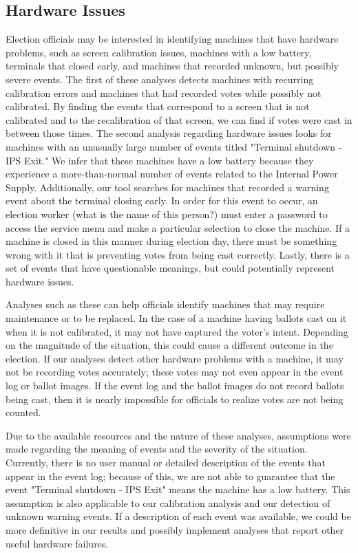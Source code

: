 \subsection{Hardware Issues}
Election officials may be interested in identifying machines that have hardware problems, such as screen calibration issues, machines with a low battery, terminals that closed early, and machines that recorded unknown, but possibly severe events.  The first of these analyses detects machines with recurring calibration errors and machines that had recorded votes while possibly not calibrated.  By finding the events that correspond to a screen that is not calibrated and to the recalibration of that screen, we can find if votes were cast in between those times.  The second analysis regarding hardware issues looks for machines with an unusually large number of events titled "Terminal shutdown - IPS Exit."  We infer that these machines have a low battery because they experience a more-than-normal number of events related to the Internal Power Supply.  Additionally, our tool searches for machines that recorded a warning event about the terminal closing early.  In order for this event to occur, an election worker (what is the name of this person?) must enter a password to access the service menu and make a particular selection to close the machine.  If a machine is closed in this manner during election day, there must be something wrong with it that is preventing votes from being cast correctly.  Lastly, there is a set of events that have questionable meanings, but could potentially represent hardware issues.   

Analyses such as these can help officials identify machines that may require maintenance or to be replaced.  In the case of a machine having ballots cast on it when it is not calibrated, it may not have captured the voter's intent.  Depending on the magnitude of the situation, this could cause a different outcome in the election.  If our analyses detect other hardware problems with a machine, it may not be recording votes accurately; these votes may not even appear in the event log or ballot images.  If the event log and the ballot images do not record ballots being cast, then it is nearly impossible for officials to realize votes are not being counted.    

Due to the available resources and the nature of these analyses, assumptions were made regarding the meaning of events and the severity of the situation.  Currently, there is no user manual or detailed description of the events that appear in the event log; because of this, we are not able to guarantee that the event "Terminal shutdown - IPS Exit" means the machine has a low battery.  This assumption is also applicable to our calibration analysis and our detection of unknown warning events.  If a description of each event was available, we could be more definitive in our results and possibly implement analyses that report other useful hardware failures.  

